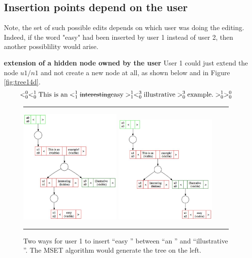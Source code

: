 \documentclass{amsart}
\begin{document}
\subsection{Insertion points depend on the user}
Note, the set of such possible edits depends on which user was doing the
editing. Indeed, 
if the word "easy" had been inserted by user 1 instead of user 2,
then another possiblility
would arise. 

{\bf extension of a hidden node owned by the user}
User 1 could just extend the node $u1/n1$
and not create a new node at all, as shown below and in Figure \ref{fig:tree14d}.
\[
 <^0_0 <^1_0 
 \text{This is an} 
   <^1_1 \text{\sout{interesting}easy}>^1_1
  <^3_0 \text{illustrative} >^3_0
  \text{example.} >^1_0 >^0_0
\]


\begin{figure}[h]
\vspace{\baselineskip}
  \hspace{\fill}\rule{\linewidth}{.7pt}\hspace{\fill}
  \vspace{\baselineskip}

\centering
\includegraphics[width=2in]{tree14b.jpg}
\includegraphics[width=2in]{tree14a.jpg}
\caption{Two ways for user 1 to insert ``easy '' 
between ``an '' and ``illustrative ''. The MSET algorithm
would generate the tree on the left. \label{fig:tree14a}}

\vspace{\baselineskip}%
  \hspace{\fill}\rule{\linewidth}{.7pt}\hspace{\fill}%
\vspace{\baselineskip}%
\end{figure}
\end{document}
